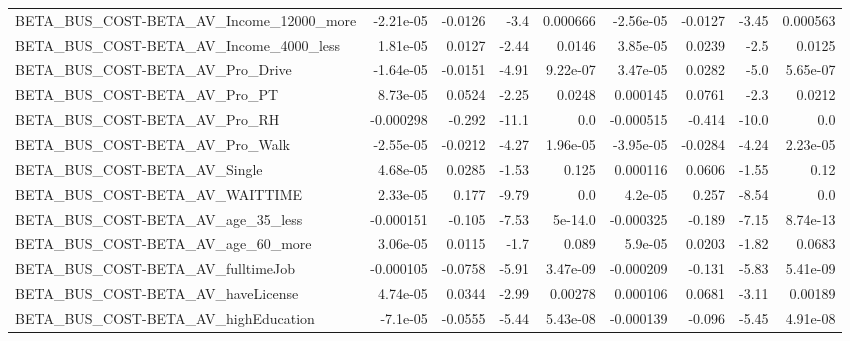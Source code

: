 \begin{tabular}{lrrrrrrrr}
BETA\_BUS\_COST-BETA\_AV\_Income\_12000\_more            &   -2.21e-05 &      -0.0126 &      -3.4 & 0.000666 &  -2.56e-05 &     -0.0127 &        -3.45 &      0.000563 \\
BETA\_BUS\_COST-BETA\_AV\_Income\_4000\_less             &    1.81e-05 &       0.0127 &     -2.44 &   0.0146 &   3.85e-05 &      0.0239 &         -2.5 &        0.0125 \\
BETA\_BUS\_COST-BETA\_AV\_Pro\_Drive                    &   -1.64e-05 &      -0.0151 &     -4.91 & 9.22e-07 &   3.47e-05 &      0.0282 &         -5.0 &      5.65e-07 \\
BETA\_BUS\_COST-BETA\_AV\_Pro\_PT                       &    8.73e-05 &       0.0524 &     -2.25 &   0.0248 &   0.000145 &      0.0761 &         -2.3 &        0.0212 \\
BETA\_BUS\_COST-BETA\_AV\_Pro\_RH                       &   -0.000298 &       -0.292 &     -11.1 &      0.0 &  -0.000515 &      -0.414 &        -10.0 &           0.0 \\
BETA\_BUS\_COST-BETA\_AV\_Pro\_Walk                     &   -2.55e-05 &      -0.0212 &     -4.27 & 1.96e-05 &  -3.95e-05 &     -0.0284 &        -4.24 &      2.23e-05 \\
BETA\_BUS\_COST-BETA\_AV\_Single                       &    4.68e-05 &       0.0285 &     -1.53 &    0.125 &   0.000116 &      0.0606 &        -1.55 &          0.12 \\
BETA\_BUS\_COST-BETA\_AV\_WAITTIME                     &    2.33e-05 &        0.177 &     -9.79 &      0.0 &    4.2e-05 &       0.257 &        -8.54 &           0.0 \\
BETA\_BUS\_COST-BETA\_AV\_age\_35\_less                  &   -0.000151 &       -0.105 &     -7.53 &  5e-14.0 &  -0.000325 &      -0.189 &        -7.15 &      8.74e-13 \\
BETA\_BUS\_COST-BETA\_AV\_age\_60\_more                  &    3.06e-05 &       0.0115 &      -1.7 &    0.089 &    5.9e-05 &      0.0203 &        -1.82 &        0.0683 \\
BETA\_BUS\_COST-BETA\_AV\_fulltimeJob                  &   -0.000105 &      -0.0758 &     -5.91 & 3.47e-09 &  -0.000209 &      -0.131 &        -5.83 &      5.41e-09 \\
BETA\_BUS\_COST-BETA\_AV\_haveLicense                  &    4.74e-05 &       0.0344 &     -2.99 &  0.00278 &   0.000106 &      0.0681 &        -3.11 &       0.00189 \\
BETA\_BUS\_COST-BETA\_AV\_highEducation                &    -7.1e-05 &      -0.0555 &     -5.44 & 5.43e-08 &  -0.000139 &      -0.096 &        -5.45 &      4.91e-08 \\

\end{tabular}
